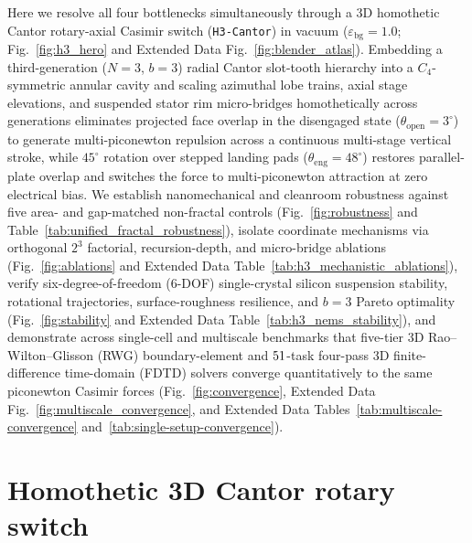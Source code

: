 \documentclass[pdflatex,sn-nature]{sn-jnl}
\begin{document}
Here we resolve all four bottlenecks simultaneously through a 3D homothetic Cantor rotary-axial Casimir switch (\texttt{H3-Cantor}) in vacuum ($\varepsilon_{\mathrm{bg}}=1.0$; Fig.~\ref{fig:h3_hero} and Extended Data Fig.~\ref{fig:blender_atlas}). Embedding a third-generation ($N=3$, $b=3$) radial Cantor slot-tooth hierarchy into a $C_4$-symmetric annular cavity and scaling azimuthal lobe trains, axial stage elevations, and suspended stator rim micro-bridges homothetically across generations eliminates projected face overlap in the disengaged state ($\theta_{\mathrm{open}}=3^\circ$) to generate multi-piconewton repulsion across a continuous multi-stage vertical stroke, while $45^\circ$ rotation over stepped landing pads ($\theta_{\mathrm{eng}}=48^\circ$) restores parallel-plate overlap and switches the force to multi-piconewton attraction at zero electrical bias. We establish nanomechanical and cleanroom robustness against five area- and gap-matched non-fractal controls (Fig.~\ref{fig:robustness} and Table~\ref{tab:unified_fractal_robustness}), isolate coordinate mechanisms via orthogonal $2^3$ factorial, recursion-depth, and micro-bridge ablations (Fig.~\ref{fig:ablations} and Extended Data Table~\ref{tab:h3_mechanistic_ablations}), verify six-degree-of-freedom (6-DOF) single-crystal silicon suspension stability, rotational trajectories, surface-roughness resilience, and $b=3$ Pareto optimality (Fig.~\ref{fig:stability} and Extended Data Table~\ref{tab:h3_nems_stability}), and demonstrate across single-cell and multiscale benchmarks that five-tier 3D Rao--Wilton--Glisson (RWG) boundary-element\cite{rao1982,reid2013pra} and $51{}$-task four-pass 3D finite-difference time-domain (FDTD)\cite{rodriguez2009pra,oskooi2010} solvers converge quantitatively to the same piconewton Casimir forces (Fig.~\ref{fig:convergence}, Extended Data Fig.~\ref{fig:multiscale_convergence}, and Extended Data Tables~\ref{tab:multiscale-convergence} and~\ref{tab:single-setup-convergence}).

\section*{Homothetic 3D Cantor rotary switch}
\label{sec:architecture}
\end{document}
